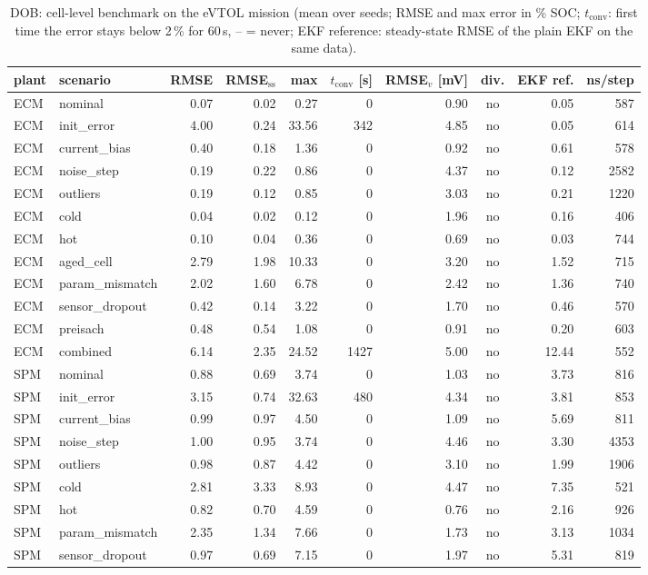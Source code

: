 \begin{table}[H]\centering\footnotesize\setlength{\tabcolsep}{4pt}
\caption{DOB: cell-level benchmark on the eVTOL mission (mean over seeds; RMSE and max error in \% SOC; $t_\mathrm{conv}$: first time the error stays below 2\,\% for 60\,s, -- = never; EKF reference: steady-state RMSE of the plain EKF on the same data).}\label{tab:cell_DOB}
\begin{tabular}{llrrrrrcrr}\toprule
plant & scenario & RMSE & RMSE$_\mathrm{ss}$ & max & $t_\mathrm{conv}$ [s] & RMSE$_v$ [mV] & div. & EKF ref. & ns/step \\ \midrule
ECM & nominal & 0.07 & 0.02 & 0.27 & 0 & 0.90 & no & 0.05 & 587 \\
ECM & init\_error & 4.00 & 0.24 & 33.56 & 342 & 4.85 & no & 0.05 & 614 \\
ECM & current\_bias & 0.40 & 0.18 & 1.36 & 0 & 0.92 & no & 0.61 & 578 \\
ECM & noise\_step & 0.19 & 0.22 & 0.86 & 0 & 4.37 & no & 0.12 & 2582 \\
ECM & outliers & 0.19 & 0.12 & 0.85 & 0 & 3.03 & no & 0.21 & 1220 \\
ECM & cold & 0.04 & 0.02 & 0.12 & 0 & 1.96 & no & 0.16 & 406 \\
ECM & hot & 0.10 & 0.04 & 0.36 & 0 & 0.69 & no & 0.03 & 744 \\
ECM & aged\_cell & 2.79 & 1.98 & 10.33 & 0 & 3.20 & no & 1.52 & 715 \\
ECM & param\_mismatch & 2.02 & 1.60 & 6.78 & 0 & 2.42 & no & 1.36 & 740 \\
ECM & sensor\_dropout & 0.42 & 0.14 & 3.22 & 0 & 1.70 & no & 0.46 & 570 \\
ECM & preisach & 0.48 & 0.54 & 1.08 & 0 & 0.91 & no & 0.20 & 603 \\
ECM & combined & 6.14 & 2.35 & 24.52 & 1427 & 5.00 & no & 12.44 & 552 \\
\midrule
SPM & nominal & 0.88 & 0.69 & 3.74 & 0 & 1.03 & no & 3.73 & 816 \\
SPM & init\_error & 3.15 & 0.74 & 32.63 & 480 & 4.34 & no & 3.81 & 853 \\
SPM & current\_bias & 0.99 & 0.97 & 4.50 & 0 & 1.09 & no & 5.69 & 811 \\
SPM & noise\_step & 1.00 & 0.95 & 3.74 & 0 & 4.46 & no & 3.30 & 4353 \\
SPM & outliers & 0.98 & 0.87 & 4.42 & 0 & 3.10 & no & 1.99 & 1906 \\
SPM & cold & 2.81 & 3.33 & 8.93 & 0 & 4.47 & no & 7.35 & 521 \\
SPM & hot & 0.82 & 0.70 & 4.59 & 0 & 0.76 & no & 2.16 & 926 \\
SPM & param\_mismatch & 2.35 & 1.34 & 7.66 & 0 & 1.73 & no & 3.13 & 1034 \\
SPM & sensor\_dropout & 0.97 & 0.69 & 7.15 & 0 & 1.97 & no & 5.31 & 819 \\
\bottomrule\end{tabular}\end{table}
